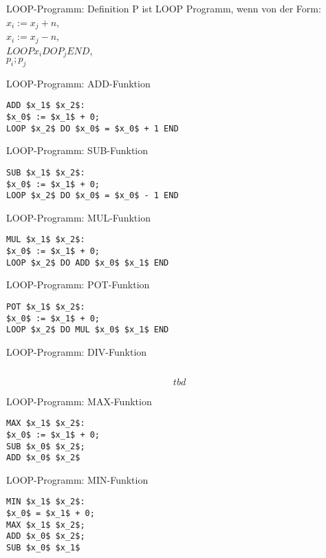 \documentclass[a7paper,print,grid=both]{kartei}
\begin{document}
\begin{karte}{LOOP-Programm: Definition}
P ist LOOP Programm, wenn von der Form:\\$x_i:=x_j+n$,\\$x_i:=x_j-n$,\\$LOOP x_i DO P_j END$,\\$p_i;p_j$
\end{karte}
\begin{karte}{LOOP-Programm: ADD-Funktion}
\begin{lstlisting}[mathescape=true]
ADD $x_1$ $x_2$:
$x_0$ := $x_1$ + 0;
LOOP $x_2$ DO $x_0$ = $x_0$ + 1 END
\end{lstlisting}
\end{karte}
\begin{karte}{LOOP-Programm: SUB-Funktion}
\begin{lstlisting}[mathescape=true]
SUB $x_1$ $x_2$:
$x_0$ := $x_1$ + 0;
LOOP $x_2$ DO $x_0$ = $x_0$ - 1 END
\end{lstlisting}
\end{karte}
\begin{karte}{LOOP-Programm: MUL-Funktion}
\begin{lstlisting}[mathescape=true]
MUL $x_1$ $x_2$:
$x_0$ := $x_1$ + 0;
LOOP $x_2$ DO ADD $x_0$ $x_1$ END
\end{lstlisting}
\end{karte}
\begin{karte}{LOOP-Programm: POT-Funktion}
\begin{lstlisting}[mathescape=true]
POT $x_1$ $x_2$:
$x_0$ := $x_1$ + 0;
LOOP $x_2$ DO MUL $x_0$ $x_1$ END
\end{lstlisting}
\end{karte}
\begin{karte}{LOOP-Programm: DIV-Funktion}
\begin{lstlisting}[mathescape=true]
\end{lstlisting}
\[tbd\]
\end{karte}
\begin{karte}{LOOP-Programm: MAX-Funktion}
\begin{lstlisting}[mathescape=true]
MAX $x_1$ $x_2$:
$x_0$ := $x_1$ + 0;
SUB $x_0$ $x_2$;
ADD $x_0$ $x_2$
\end{lstlisting}
\end{karte}
\begin{karte}{LOOP-Programm: MIN-Funktion}
\begin{lstlisting}[mathescape=true]
MIN $x_1$ $x_2$:
$x_0$ = $x_1$ + 0;
MAX $x_1$ $x_2$;
ADD $x_0$ $x_2$;
SUB $x_0$ $x_1$
\end{lstlisting}
\end{karte}
\end{document}
